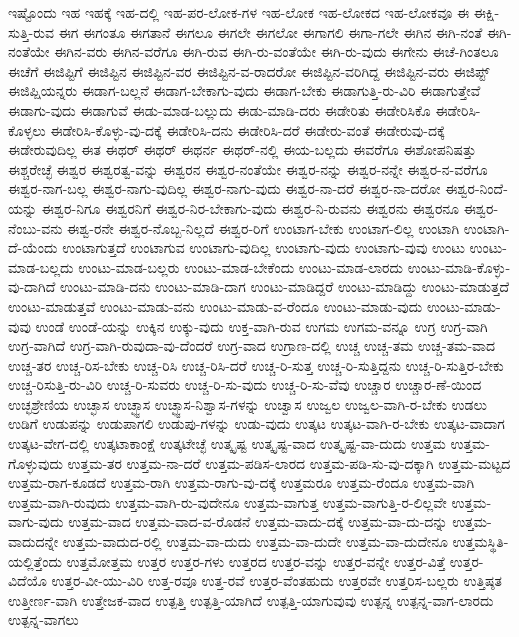 {ಇಷ್ಟೊಂದು
ಇಹ
ಇಹಕ್ಕೆ
ಇಹ-ದಲ್ಲಿ
ಇಹ-ಪರ-ಲೋಕ-ಗಳ
ಇಹ-ಲೋಕ
ಇಹ-ಲೋಕದ
ಇಹ-ಲೋಕವೂ
ಈ
ಈಕ್ಷಿ-ಸುತ್ತಿ-ರುವ
ಈಗ
ಈಗಂತೂ
ಈಗತಾನೆ
ಈಗಲೂ
ಈಗಲೇ
ಈಗಲೋ
ಈಗಾಗಲಿ
ಈಗಾ-ಗಲೇ
ಈಗಿನ
ಈಗಿ-ನಂತೆ
ಈಗಿ-ನಂತೆಯೇ
ಈಗಿನ-ವರು
ಈಗಿನ-ವರೆಗೂ
ಈಗಿ-ರುವ
ಈಗಿ-ರು-ವಂತೆಯೇ
ಈಗಿ-ರು-ವುದು
ಈಗೇನು
ಈಚೆ-ಗಿಂತಲೂ
ಈಚೆಗೆ
ಈಜಿಪ್ಟಿಗೆ
ಈಜಿಪ್ಟಿನ
ಈಜಿಪ್ಟಿನ-ವರ
ಈಜಿಪ್ಟಿನ-ವ-ರಾದರೋ
ಈಜಿಪ್ಟಿನ-ವರಿಗಿದ್ದ
ಈಜಿಪ್ಟಿನ-ವರು
ಈಜಿಪ್ಟ್
ಈಜಿಪ್ಷಿಯನ್ನರು
ಈಡಾಗ-ಬಲ್ಲನೆ
ಈಡಾಗ-ಬೇಕಾಗು-ವುದು
ಈಡಾಗ-ಬೇಕು
ಈಡಾಗುತ್ತಿ-ರು-ವಿರಿ
ಈಡಾಗುತ್ತೇವೆ
ಈಡಾಗು-ವುದು
ಈಡಾಗುವೆ
ಈಡು-ಮಾಡ-ಬಲ್ಲುದು
ಈಡು-ಮಾಡಿ-ದರು
ಈಡೇರಿತು
ಈಡೇರಿಸಿಕೊ
ಈಡೇರಿಸಿ-ಕೊಳ್ಳಲು
ಈಡೇರಿಸಿ-ಕೊಳ್ಳು-ವು-ದಕ್ಕೆ
ಈಡೇರಿಸಿ-ದನು
ಈಡೇರಿಸಿ-ದರೆ
ಈಡೇರು-ವಂತೆ
ಈಡೇರುವು-ದಕ್ಕೆ
ಈಡೇರುವುದಿಲ್ಲ
ಈತ
ಈಥರ್
ಈಥರ್
ಈಥರ್ನ
ಈಥರ್-ನಲ್ಲಿ
ಈಯ-ಬಲ್ಲದು
ಈವರೆಗೂ
ಈಶೋಪನಿಷತ್ತು
ಈಶ್ಚರೇಚ್ಛೆ
ಈಶ್ವರ
ಈಶ್ವರತ್ವ-ವನ್ನು
ಈಶ್ವರನ
ಈಶ್ವರ-ನಂತೆಯೇ
ಈಶ್ವರ-ನನ್ನು
ಈಶ್ವರ-ನನ್ನೇ
ಈಶ್ವರ-ನ-ವರೆಗೂ
ಈಶ್ವರ-ನಾಗ-ಬಲ್ಲ
ಈಶ್ವರ-ನಾಗು-ವುದಿಲ್ಲ
ಈಶ್ವರ-ನಾಗು-ವುದು
ಈಶ್ವರ-ನಾ-ದರೆ
ಈಶ್ವರ-ನಾ-ದರೋ
ಈಶ್ವರ-ನಿಂದೆ-ಯನ್ನು
ಈಶ್ವರ-ನಿಗೂ
ಈಶ್ವರನಿಗೆ
ಈಶ್ವರ-ನಿರ-ಬೇಕಾಗು-ವುದು
ಈಶ್ವರ-ನಿ-ರುವನು
ಈಶ್ವರನು
ಈಶ್ವರನೂ
ಈಶ್ವರ-ನೆಂಬು-ವನು
ಈಶ್ವ-ರನೇ
ಈಶ್ವರ-ನೊಬ್ಬ-ನಿಲ್ಲದೆ
ಈಶ್ವರ-ರಿಗೆ
ಉಂಟಾಗ-ಬೇಕು
ಉಂಟಾಗ-ಲಿಲ್ಲ
ಉಂಟಾಗಿ
ಉಂಟಾಗಿ-ದೆ-ಯೆಂದು
ಉಂಟಾಗುತ್ತದೆ
ಉಂಟಾಗುವ
ಉಂಟಾಗು-ವುದಿಲ್ಲ
ಉಂಟಾಗು-ವುದು
ಉಂಟಾಗು-ವುವು
ಉಂಟು
ಉಂಟು-ಮಾಡ-ಬಲ್ಲದು
ಉಂಟು-ಮಾಡ-ಬಲ್ಲರು
ಉಂಟು-ಮಾಡ-ಬೇಕೆಂದು
ಉಂಟು-ಮಾಡ-ಲಾರದು
ಉಂಟು-ಮಾಡಿ-ಕೊಳ್ಳು-ವು-ದಾಗಿದೆ
ಉಂಟು-ಮಾಡಿ-ದನು
ಉಂಟು-ಮಾಡಿ-ದಾಗ
ಉಂಟು-ಮಾಡಿದ್ದರೆ
ಉಂಟು-ಮಾಡಿದ್ದು
ಉಂಟು-ಮಾಡುತ್ತದೆ
ಉಂಟು-ಮಾಡುತ್ತವೆ
ಉಂಟು-ಮಾಡು-ವನು
ಉಂಟು-ಮಾಡು-ವ-ರೆಂದೂ
ಉಂಟು-ಮಾಡು-ವುದು
ಉಂಟು-ಮಾಡು-ವುವು
ಉಂಡೆ
ಉಂಡೆ-ಯನ್ನು
ಉಕ್ಕಿನ
ಉಕ್ಕು-ವುದು
ಉಕ್ತ-ವಾಗಿ-ರುವ
ಉಗಮ
ಉಗಮ-ವನ್ನೂ
ಉಗ್ರ
ಉಗ್ರ-ವಾಗಿ
ಉಗ್ರ-ವಾಗಿದೆ
ಉಗ್ರ-ವಾಗಿ-ರುವುದಾ-ವು-ದೆಂದರೆ
ಉಗ್ರ-ವಾದ
ಉಗ್ರಾಣ-ದಲ್ಲಿ
ಉಚ್ಚ
ಉಚ್ಚ-ತಮ
ಉಚ್ಚ-ತಮ-ವಾದ
ಉಚ್ಚ-ತರ
ಉಚ್ಚ-ರಿಸ-ಬೇಕು
ಉಚ್ಚ-ರಿಸಿ
ಉಚ್ಚ-ರಿಸಿ-ದರೆ
ಉಚ್ಚ-ರಿ-ಸುತ್ತ
ಉಚ್ಚ-ರಿ-ಸುತ್ತಿದ್ದನು
ಉಚ್ಚ-ರಿ-ಸುತ್ತಿರ-ಬೇಕು
ಉಚ್ಚ-ರಿಸುತ್ತಿ-ರು-ವಿರಿ
ಉಚ್ಚ-ರಿ-ಸುವರು
ಉಚ್ಚ-ರಿ-ಸು-ವುದು
ಉಚ್ಚ-ರಿ-ಸು-ವೆವು
ಉಚ್ಚಾರ
ಉಚ್ಚಾರ-ಣೆ-ಯಿಂದ
ಉಚ್ಛಶ್ರೇಣಿಯ
ಉಚ್ಛಾಸ
ಉಚ್ಛ್ವಾಸ
ಉಚ್ಛ್ವಾಸ-ನಿಶ್ವಾಸ-ಗಳನ್ನು
ಉಚ್ವಾಸ
ಉಜ್ವಲ
ಉಜ್ವಲ-ವಾಗಿ-ರ-ಬೇಕು
ಉಡಲು
ಉಡಿಗೆ
ಉಡುಪನ್ನು
ಉಡುಪಾಗಲಿ
ಉಡುಪು-ಗಳನ್ನು
ಉಡು-ವುದು
ಉತ್ಕಟ
ಉತ್ಕಟ-ವಾಗಿ-ರ-ಬೇಕು
ಉತ್ಕಟ-ವಾದಾಗ
ಉತ್ಕಟ-ವೇಗ-ದಲ್ಲಿ
ಉತ್ಕಟಾಕಾಂಕ್ಷೆ
ಉತ್ಕಟೇಚ್ಛೆ
ಉತ್ಕೃಷ್ಟ
ಉತ್ಕೃಷ್ಟ-ವಾದ
ಉತ್ಕೃಷ್ಟ-ವಾ-ದುದು
ಉತ್ತಮ
ಉತ್ತಮ-ಗೊಳ್ಳುವುದು
ಉತ್ತಮ-ತರ
ಉತ್ತಮ-ನಾ-ದರೆ
ಉತ್ತಮ-ಪಡಿಸ-ಲಾರದ
ಉತ್ತಮ-ಪಡಿ-ಸು-ವು-ದಕ್ಕಾಗಿ
ಉತ್ತಮ-ಮಟ್ಟದ
ಉತ್ತಮ-ರಾಗ-ಕೂಡದೆ
ಉತ್ತಮ-ರಾಗಿ
ಉತ್ತಮ-ರಾಗು-ವು-ದಕ್ಕೆ
ಉತ್ತಮರೂ
ಉತ್ತಮ-ರೆಂದೂ
ಉತ್ತಮ-ವಾಗಿ
ಉತ್ತಮ-ವಾಗಿ-ರುವುದು
ಉತ್ತಮ-ವಾಗಿ-ರು-ವುದೇನೂ
ಉತ್ತಮ-ವಾಗುತ್ತ
ಉತ್ತಮ-ವಾಗುತ್ತಿ-ರ-ಲಿಲ್ಲವೇ
ಉತ್ತಮ-ವಾಗು-ವುದು
ಉತ್ತಮ-ವಾದ
ಉತ್ತಮ-ವಾದ-ವ-ರೊಡನೆ
ಉತ್ತಮ-ವಾದು-ದಕ್ಕೆ
ಉತ್ತಮ-ವಾ-ದು-ದನ್ನು
ಉತ್ತಮ-ವಾದುದನ್ನೇ
ಉತ್ತಮ-ವಾದುದ-ರಲ್ಲಿ
ಉತ್ತಮ-ವಾ-ದುದು
ಉತ್ತಮ-ವಾ-ದುದೇ
ಉತ್ತಮ-ವಾ-ದುದೇನೂ
ಉತ್ತಮಸ್ಥಿತಿ-ಯಲ್ಲಿತ್ತೆಂದು
ಉತ್ತಮೋತ್ತಮ
ಉತ್ತರ
ಉತ್ತರ-ಗಳು
ಉತ್ತರದ
ಉತ್ತರ-ವನ್ನು
ಉತ್ತರ-ವನ್ನೇ
ಉತ್ತರ-ವಿತ್ತೆ
ಉತ್ತರ-ವಿದೆಯೊ
ಉತ್ತರ-ವೀ-ಯು-ವಿರಿ
ಉತ್ತ-ರವೂ
ಉತ್ತ-ರವೆ
ಉತ್ತರ-ವೆಂತಹುದು
ಉತ್ತರವೇ
ಉತ್ತರಿಸ-ಬಲ್ಲರು
ಉತ್ತಿಷ್ಠತ
ಉತ್ತೀರ್ಣ-ವಾಗಿ
ಉತ್ತೇಜಕ-ವಾದ
ಉತ್ಪತ್ತಿ
ಉತ್ಪತ್ತಿ-ಯಾಗಿದೆ
ಉತ್ಪತ್ತಿ-ಯಾಗುವುವು
ಉತ್ಪನ್ನ
ಉತ್ಪನ್ನ-ವಾಗ-ಲಾರದು
ಉತ್ಪನ್ನ-ವಾಗಲು
}
